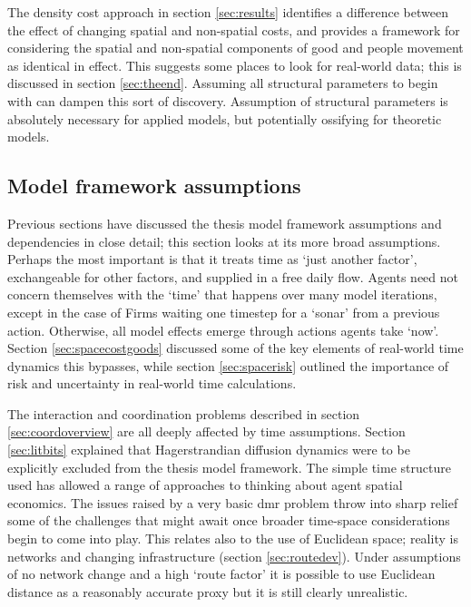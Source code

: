The density cost approach in section \ref{sec:results} identifies a difference between the effect of changing spatial and non-spatial costs, and provides a framework for considering the spatial and non-spatial components of good and people movement as identical in effect. This suggests some places to look for real-world data; this is discussed in section \ref{sec:theend}. Assuming all structural parameters to begin with can dampen this sort of discovery. Assumption of structural parameters is absolutely necessary for applied models, but potentially ossifying for theoretic models. 

\subsection{Model framework assumptions}
Previous sections have discussed the thesis model framework assumptions and dependencies in close detail; this section looks at its more broad assumptions. Perhaps the most important is that it treats time as `just another factor', exchangeable for other factors, and supplied in a free daily flow. Agents need not concern themselves with the `time' that happens over many model iterations, except in the case of Firms waiting one timestep for a `sonar' from a previous action. Otherwise, all model effects emerge through actions agents take `now'. Section \ref{sec:spacecostgoods} discussed some of the key elements of real-world time dynamics this bypasses, while section \ref{sec:spacerisk} outlined the importance of risk and uncertainty in real-world time calculations. 

The interaction and coordination problems described in section \ref{sec:coordoverview} are all deeply affected by time assumptions. Section \ref{sec:litbits} explained that Hagerstrandian diffusion dynamics were to be explicitly excluded from the thesis model framework. The simple time structure used has allowed a range of approaches to thinking about agent spatial economics. The issues raised by a very basic \gls{dmr} problem throw into sharp relief some of the challenges that might await once broader time-space considerations begin to come into play. This relates also to the use of Euclidean space; reality is networks and changing infrastructure (section \ref{sec:routedev}). Under assumptions of no network change and a high `route factor' it is possible to use Euclidean distance as a reasonably accurate proxy but it is still clearly unrealistic.

